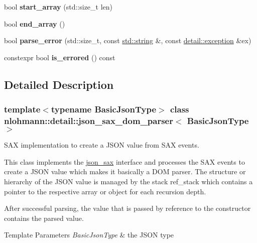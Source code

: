 \begin{DoxyCompactItemize}
bool {\bfseries start\+\_\+array} (std\+::size\+\_\+t len)
\item 
\mbox{\label{classnlohmann_1_1detail_1_1json__sax__dom__parser_af7cb5e5fe06ea908b0ce4ed762919759}} 
bool {\bfseries end\+\_\+array} ()
\item 
\mbox{\label{classnlohmann_1_1detail_1_1json__sax__dom__parser_a7d3bf1f361ebb817c694ba45b3814fa6}} 
bool {\bfseries parse\+\_\+error} (std\+::size\+\_\+t, const \hyperlink{namespacenlohmann_1_1detail_a1ed8fc6239da25abcaf681d30ace4985ab45cffe084dd3d20d928bee85e7b0f21}{std\+::string} \&, const \hyperlink{classnlohmann_1_1detail_1_1exception}{detail\+::exception} \&ex)
\item 
\mbox{\label{classnlohmann_1_1detail_1_1json__sax__dom__parser_ad1b9f3681fadbbb2e0127f5c8a99c662}} 
constexpr bool {\bfseries is\+\_\+errored} () const
\end{DoxyCompactItemize}


\subsection{Detailed Description}
\subsubsection*{template$<$typename Basic\+Json\+Type$>$\newline
class nlohmann\+::detail\+::json\+\_\+sax\+\_\+dom\+\_\+parser$<$ Basic\+Json\+Type $>$}

S\+AX implementation to create a J\+S\+ON value from S\+AX events. 

This class implements the \hyperlink{structnlohmann_1_1json__sax}{json\+\_\+sax} interface and processes the S\+AX events to create a J\+S\+ON value which makes it basically a D\+OM parser. The structure or hierarchy of the J\+S\+ON value is managed by the stack {\ttfamily ref\+\_\+stack} which contains a pointer to the respective array or object for each recursion depth.

After successful parsing, the value that is passed by reference to the constructor contains the parsed value.


\begin{DoxyTemplParams}{Template Parameters}
{\em Basic\+Json\+Type} & the J\+S\+ON type \\
\hline
\end{DoxyTemplParams}


